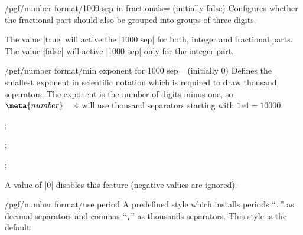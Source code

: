 \begin{key}{/pgf/number format/1000 sep in fractionals= (initially false)}
  Configures whether the fractional part should also be grouped into
  groups of three digits. 

  The value |true| will active the |1000 sep| for both, integer and
  fractional parts. The value |false| will active |1000 sep| only for the integer part.
\begin{codeexample}[]
\end{codeexample}
\begin{codeexample}[]
\end{codeexample}
\end{key}

\begin{key}{/pgf/number format/min exponent for 1000 sep= (initially 0)}
  Defines the smallest exponent in scientific notation which is
  required to draw thousand separators. The exponent is the number of
  digits minus one, so $\meta{number}=4$ will use thousand separators
  starting with $1e4 = 10000$. 
\begin{codeexample}[]
; 
\end{codeexample}

\begin{codeexample}[]
; 
\end{codeexample}
\begin{codeexample}[]
; 
\end{codeexample}
  \noindent A value of |0| disables this feature (negative values are
  ignored). 
\end{key}

\begin{key}{/pgf/number format/use period}
  A predefined style which installs periods ``\texttt{.}'' as decimal
  separators and commas ``\texttt{,}'' as thousands separators. This
  style is the default. 

\begin{codeexample}[]
\end{codeexample}
\begin{codeexample}[]
\end{codeexample}
\end{key}

